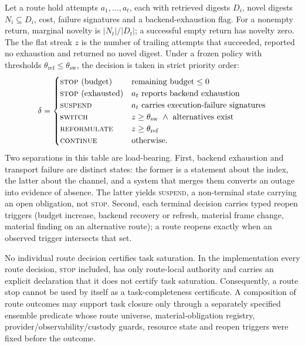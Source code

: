 Let a route hold attempts $a_1,\dots,a_t$, each with retrieved digests
$D_i$, novel digests $N_i \subseteq D_i$, cost, failure signatures and a
backend-exhaustion flag. For a nonempty return, marginal novelty is
$|N_t|/|D_t|$; a successful empty return has novelty zero. The
the flat streak $z$ is the number of trailing attempts that succeeded, reported
no exhaustion and returned no novel digest. Under a frozen policy with
thresholds $\theta_{\mathrm{ref}} \leq \theta_{\mathrm{sw}}$, the decision is
taken in strict priority order:
\[
\delta =
\begin{cases}
\textsc{stop}\ (\text{budget}) & \text{remaining budget} \leq 0\\
\textsc{stop}\ (\text{exhausted}) & a_t\ \text{reports backend exhaustion}\\
\textsc{suspend} & a_t\ \text{carries execution-failure signatures}\\
\textsc{switch} & z \geq \theta_{\mathrm{sw}}\ \wedge\ \text{alternatives exist}\\
\textsc{reformulate} & z \geq \theta_{\mathrm{ref}}\\
\textsc{continue} & \text{otherwise.}
\end{cases}
\]
Two separations in this table are load-bearing. First, backend exhaustion and
transport failure are distinct states: the former is a statement about the
index, the latter about the channel, and a system that merges them converts an
outage into evidence of absence. The latter yields \textsc{suspend}, a
non-terminal state carrying an open obligation, not \textsc{stop}. Second, each
terminal decision carries typed reopen triggers (budget increase, backend
recovery or refresh, material frame change, material finding on an alternative
route); a route reopens exactly when an observed trigger intersects that set.

\begin{proposition}
\label{prop:failclosed}
No individual route decision certifies task saturation. In the implementation
every route decision, \textsc{stop} included, has only route-local authority and
carries an explicit declaration that it does not certify task saturation.
Consequently, a route stop cannot be used by itself as a task-completeness
certificate. A composition of route outcomes may support task closure only
through a separately specified ensemble predicate whose route universe,
material-obligation registry, provider/observability/custody guards, resource
state and reopen triggers were fixed before the outcome.
\end{proposition}

